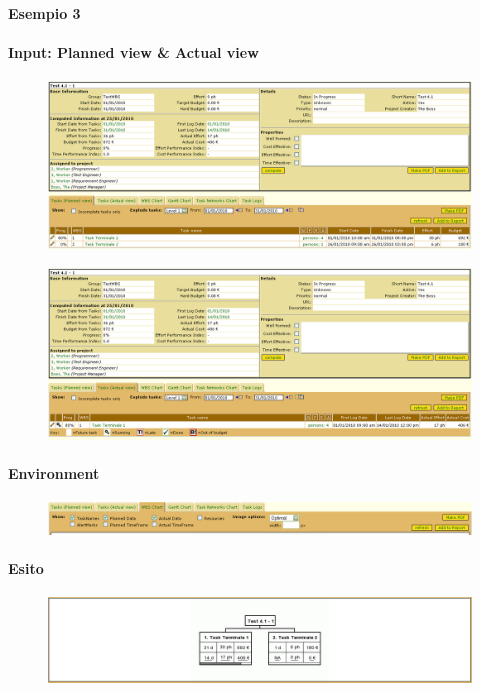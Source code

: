 \paragraph{Esempio 3}
\paragraph{Input: Planned view & Actual view}
\begin{figure}[h!]
\centering
\includegraphics[width=\textwidth]{tests/TEST_WBS/4.1/4.1_1/Esempio_3/input.png}
\end{figure}
\begin{figure}[h!]
\centering
\includegraphics[width=\textwidth]{tests/TEST_WBS/4.1/4.1_1/Esempio_3/input_actual.png}
\end{figure}
\newpage

\paragraph{Environment}
\begin{figure}[h!]
\centering
\includegraphics[width=\textwidth]{tests/TEST_WBS/4.1/4.1_1/Esempio_3/environment.png}
\end{figure}

\paragraph{Esito}
\begin{figure}[h!]
\centering
\includegraphics[width=\textwidth]{tests/TEST_WBS/4.1/4.1_1/Esempio_3/output.png}
\end{figure}
\newpage


